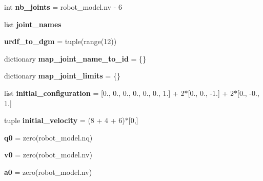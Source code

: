 \begin{DoxyCompactItemize}
int {\bfseries nb\+\_\+joints} = robot\+\_\+model.\+nv -\/ 6
\item 
list {\bfseries joint\+\_\+names}
\item 
\mbox{\label{classrobot__properties__solo_1_1config_1_1Solo12Config_aa6f805fed402a68b39d6e1475dfcef05}} 
{\bfseries urdf\+\_\+to\+\_\+dgm} = tuple(range(12))
\item 
\mbox{\label{classrobot__properties__solo_1_1config_1_1Solo12Config_a8148415891b823708671022d90ac8f6b}} 
dictionary {\bfseries map\+\_\+joint\+\_\+name\+\_\+to\+\_\+id} = \{\}
\item 
\mbox{\label{classrobot__properties__solo_1_1config_1_1Solo12Config_ab3a7f64fca555f8ee73c06f71d99af90}} 
dictionary {\bfseries map\+\_\+joint\+\_\+limits} = \{\}
\item 
\mbox{\label{classrobot__properties__solo_1_1config_1_1Solo12Config_a2d6bbb2bc632a163fbc386abfde9e6a5}} 
list {\bfseries initial\+\_\+configuration} = \mbox{[}0., 0., 0., 0., 0., 0., 1.\mbox{]} + 2$\ast$\mbox{[}0., 0., -\/1.\mbox{]} + 2$\ast$\mbox{[}0., -\/0., 1.\mbox{]}
\item 
\mbox{\label{classrobot__properties__solo_1_1config_1_1Solo12Config_a5638c3bba9a6835894ecab05d9343588}} 
tuple {\bfseries initial\+\_\+velocity} = (8 + 4 + 6)$\ast$\mbox{[}0,\mbox{]}
\item 
\mbox{\label{classrobot__properties__solo_1_1config_1_1Solo12Config_af6fbeb7fc77a83c26a73f482c413d2bd}} 
{\bfseries q0} = zero(robot\+\_\+model.\+nq)
\item 
\mbox{\label{classrobot__properties__solo_1_1config_1_1Solo12Config_a68c4956a9648e0a0d5a1824d9280c78b}} 
{\bfseries v0} = zero(robot\+\_\+model.\+nv)
\item 
\mbox{\label{classrobot__properties__solo_1_1config_1_1Solo12Config_ab4e7dec46a911e8217770c01b17e0d95}} 
{\bfseries a0} = zero(robot\+\_\+model.\+nv)
\end{DoxyCompactItemize}
